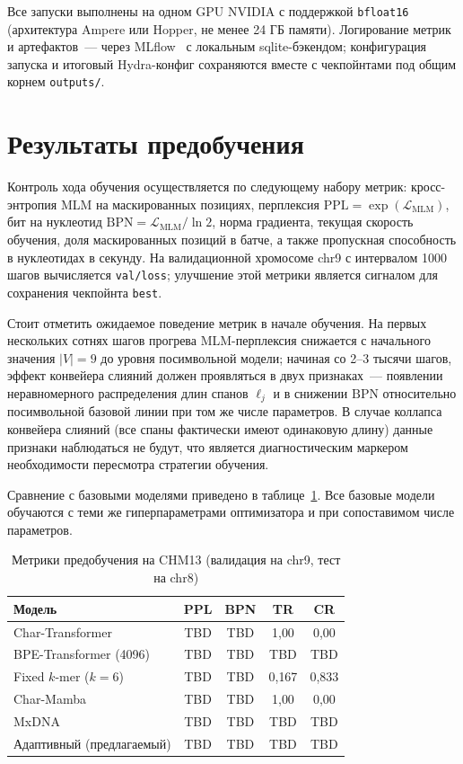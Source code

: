 Все запуски выполнены на одном GPU NVIDIA с поддержкой
\texttt{bfloat16} (архитектура Ampere или Hopper, не менее 24 ГБ
памяти). Логирование метрик и артефактов~--- через
MLflow~\cite{Zaharia_Accelerating_the_Machine_2018} с локальным
sqlite-бэкендом; конфигурация запуска и итоговый Hydra-конфиг
сохраняются вместе с чекпойнтами под общим корнем \texttt{outputs/}.

\section{Результаты предобучения}

Контроль хода обучения осуществляется по следующему набору метрик:
кросс-энтропия MLM на маскированных позициях, перплексия
$\mathrm{PPL} = \exp(\mathcal L_{\text{MLM}})$, бит на нуклеотид
$\mathrm{BPN} = \mathcal L_{\text{MLM}} / \ln 2$, норма градиента,
текущая скорость обучения, доля маскированных позиций в батче, а
также пропускная способность в нуклеотидах в секунду. На валидационной
хромосоме chr9 с интервалом 1000 шагов вычисляется \texttt{val/loss};
улучшение этой метрики является сигналом для сохранения чекпойнта
\texttt{best}.

Стоит отметить ожидаемое поведение метрик в начале обучения. На
первых нескольких сотнях шагов прогрева MLM-перплексия снижается с
начального значения $|V| = 9$ до уровня посимвольной модели; начиная
со 2--3 тысячи шагов, эффект конвейера слияний должен проявляться в
двух признаках~--- появлении неравномерного распределения длин спанов
$\ell_j$ и в снижении $\mathrm{BPN}$ относительно посимвольной базовой
линии при том же числе параметров. В случае коллапса конвейера
слияний (все спаны фактически имеют одинаковую длину) данные
признаки наблюдаться не будут, что является диагностическим
маркером необходимости пересмотра стратегии обучения.

Сравнение с базовыми моделями приведено в таблице~\ref{tab:pretrain}.
Все базовые модели обучаются с теми же гиперпараметрами оптимизатора
и при сопоставимом числе параметров.

\begin{table}[h]
\centering
\caption{Метрики предобучения на CHM13 (валидация на chr9, тест на chr8)}
\label{tab:pretrain}
\begin{tabular}{lcccc}
\toprule
Модель & PPL & BPN & TR & CR \\
\midrule
Char-Transformer & TBD & TBD & 1{,}00 & 0{,}00 \\
BPE-Transformer (4096) & TBD & TBD & TBD & TBD \\
Fixed $k$-mer ($k = 6$) & TBD & TBD & 0{,}167 & 0{,}833 \\
Char-Mamba & TBD & TBD & 1{,}00 & 0{,}00 \\
MxDNA~\cite{qiaoMxDNAAdaptiveDNA2024} & TBD & TBD & TBD & TBD \\
Адаптивный (предлагаемый) & TBD & TBD & TBD & TBD \\
\bottomrule
\end{tabular}
\end{table}

